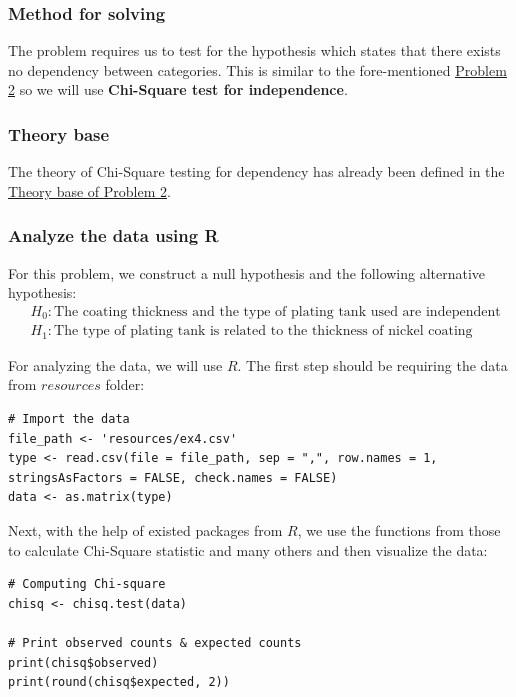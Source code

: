 \documentclass[a4paper]{article}
\numberwithin{equation}{section}
\begin{document}
\subsubsection{Method for solving}
The problem requires us to test for the hypothesis which states that there exists no dependency between categories. This is similar to the fore-mentioned \hyperref[p2]{\underline{Problem 2}} so we will use \textbf{Chi-Square test for independence}.

\subsubsection{Theory base}
The theory of Chi-Square testing for dependency has already been defined in the \hyperref[p2:theory]{\underline{Theory base of Problem 2}}.

\subsubsection{Analyze the data using R}
For this problem, we construct a null hypothesis and the following alternative hypothesis:
\begin{align*}
   & H_0 : \text{The coating thickness and the type of plating tank used are independent} \\
   & H_1 : \text{The type of plating tank is related to the thickness of nickel coating}
\end{align*}

For analyzing the data, we will use \(R\). The first step should be requiring the data from \(resources\) folder:
\begin{mdframed}[leftline=false,rightline=false,backgroundcolor=magenta!10,nobreak=true]
  \begin{verbatim}
# Import the data
file_path <- 'resources/ex4.csv'
type <- read.csv(file = file_path, sep = ",", row.names = 1, stringsAsFactors = FALSE, check.names = FALSE)
data <- as.matrix(type)
  \end{verbatim}
\end{mdframed}

Next, with the help of existed packages from \(R\), we use the functions from those to calculate Chi-Square statistic and many others and then visualize the data:
\begin{mdframed}[leftline=false,rightline=false,backgroundcolor=magenta!10,nobreak=true]
  \begin{verbatim}
# Computing Chi-square
chisq <- chisq.test(data)

# Print observed counts & expected counts
print(chisq$observed)
print(round(chisq$expected, 2))
  \end{verbatim}
\end{mdframed}
\end{document}
